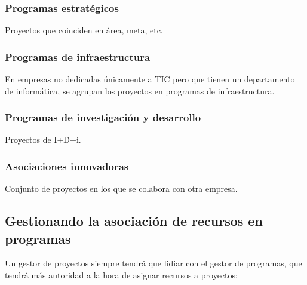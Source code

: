 \documentclass[12pt]{article}
\begin{document}
\subsubsection{Programas estratégicos}
\label{2.7.2}

{Proyectos que coinciden en área, meta, etc.}

\subsubsection{Programas de infraestructura}
\label{2.7.3}

{En empresas no dedicadas únicamente a TIC pero que tienen un departamento de informática, se agrupan los proyectos en programas de infraestructura.}

\subsubsection{Programas de investigación y desarrollo}
\label{2.7.4}

{Proyectos de I+D+i.}

\subsubsection{Asociaciones innovadoras}
\label{2.7.5}

{Conjunto de proyectos en los que se colabora con otra empresa.}

\subsection[Gestionando la asociación de recursos en programas]{Gestionando la asociación de recursos en \\programas}
\label{2.8.0}

{Un gestor de proyectos siempre tendrá que lidiar con el gestor de programas, que tendrá más autoridad a la hora de asignar recursos a proyectos:}
\end{document}
